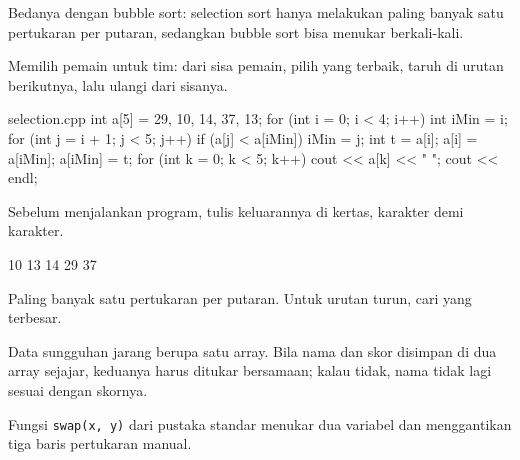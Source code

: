 \documentclass[a4paper]{article}
\begin{document}
Bedanya dengan bubble sort: selection sort hanya melakukan paling banyak satu pertukaran per putaran, sedangkan bubble sort bisa menukar berkali-kali.

\begin{Contoh}
Memilih pemain untuk tim: dari sisa pemain, pilih yang terbaik, taruh di urutan berikutnya, lalu ulangi dari sisanya.
\end{Contoh}
\begin{MKode}{selection.cpp}
int a[5] = {29, 10, 14, 37, 13};
for (int i = 0; i < 4; i++) {
    int iMin = i;
    for (int j = i + 1; j < 5; j++) {
        if (a[j] < a[iMin]) iMin = j;
    }
    int t = a[i]; a[i] = a[iMin]; a[iMin] = t;
}
for (int k = 0; k < 5; k++) cout << a[k] << " ";
cout << endl;
\end{MKode}
\begin{Tebak}[]
Sebelum menjalankan program, tulis keluarannya di kertas, karakter demi karakter.
\end{Tebak}
\begin{Jawaban}[]
\begin{MKeluaran}[]
10 13 14 29 37 
\end{MKeluaran}
Paling banyak satu pertukaran per putaran. Untuk urutan turun, cari yang terbesar.
\end{Jawaban}
Data sungguhan jarang berupa satu array. Bila nama dan skor disimpan di dua array sejajar, keduanya harus ditukar bersamaan; kalau tidak, nama tidak lagi sesuai dengan skornya.

Fungsi \texttt{swap(x, y)} dari pustaka standar menukar dua variabel dan menggantikan tiga baris pertukaran manual.
\end{document}
